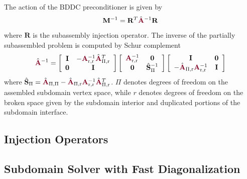 \begin{definition}
The action of the BDDC preconditioner is given by
\begin{equation}
\mathbf{M}^{-1} = \mathbf{R}^T \hat{\color{burgundy}\mathbf{A}}^{-1} \mathbf{R}
\end{equation}
where $\mathbf{R}$ is the subassembly injection operator.
The inverse of the partially subassembled problem is computed by Schur complement
\begin{equation}
\hat{\color{burgundy}\mathbf{A}}^{-1} =
\left[ \begin{array}{c c}
\mathbf{I}  &  -{\color{burgundy}\mathbf{A}}_{\text{r}, \text{r}}^{-1} \hat{\color{burgundy}\mathbf{A}}_{\Pi, \text{r}}^T  \\
\mathbf{0}  &  \mathbf{I}                                                                                                  \\
\end{array} \right]
\left[ \begin{array}{c c}
{\color{burgundy}\mathbf{A}}_{\text{r}, \text{r}}^{-1}  &  \mathbf{0}                   \\
\mathbf{0}                                              &  \hat{\mathbf{S}}_{\Pi}^{-1}  \\
\end{array} \right]
\left[ \begin{array}{c c}
\mathbf{I}                                                                                                &  \mathbf{0}  \\
-\hat{\color{burgundy}\mathbf{A}}_{\Pi, \text{r}} {\color{burgundy}\mathbf{A}}_{\text{r}, \text{r}}^{-1}  &  \mathbf{I}  \\
\end{array} \right]
\end{equation}
where $\hat{\mathbf{S}}_{\Pi} = \hat{\color{burgundy}\mathbf{A}}_{\Pi, \Pi} - \hat{\color{burgundy}\mathbf{A}}_{\Pi, \text{r}} {\color{burgundy}\mathbf{A}}_{\text{r}, \text{r}}^{-1} \hat{\color{burgundy}\mathbf{A}}_{\Pi, \text{r}}^T$.
$\Pi$ denotes degrees of freedom on the assembled subdomain vertex space, while $r$ denotes degrees of freedom on the broken space given by the subdomain interior and duplicated portions of the subdomain interface.
\label{def:bddcpreconditioner}
\end{definition}

\subsection{Injection Operators}


\subsection{Subdomain Solver with Fast Diagonalization}

